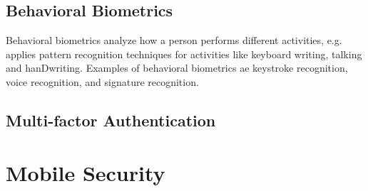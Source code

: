       \subsection*{Behavioral Biometrics}

        Behavioral biometrics analyze how a person performs different activities, e.g. applies pattern recognition techniques for activities like keyboard writing, talking and hanDwriting. Examples of behavioral biometrics ae keystroke recognition, voice recognition, and signature recognition. 

    \subsection{Multi-factor Authentication}

  \section{Mobile Security}






